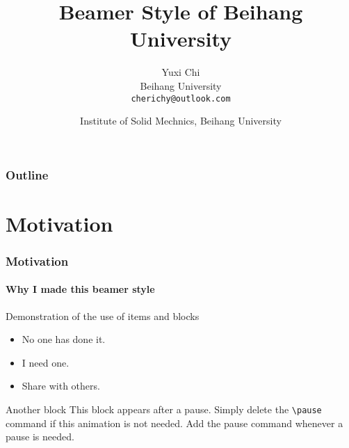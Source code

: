 \documentclass[10pt]{beamer}
\title{Beamer Style of Beihang University}
\author{Yuxi Chi\\
Beihang University\\
\texttt{cherichy@outlook.com}}
\date{Institute of Solid Mechnics, Beihang University}
\begin{document}
\begin{frame}[plain]
\maketitle
\end{frame}

\begin{frame}
\frametitle{Outline}
\tableofcontents
\end{frame}
\section{Motivation}
\begin{frame}
\frametitle{Motivation}
\framesubtitle{Why I made this beamer style}
\begin{block}{Demonstration of the use of items and blocks}
\begin{itemize}
\item No one has done it.
\item I need one.
\pause \item Share with others.
\end{itemize}
\end{block}
\pause
\begin{block}{Another block}
This block appears after a pause. Simply delete the \texttt{\textbackslash pause} command if this animation is not needed. Add the pause command whenever a pause is needed. 
\end{block}
\end{frame}

\end{document}
